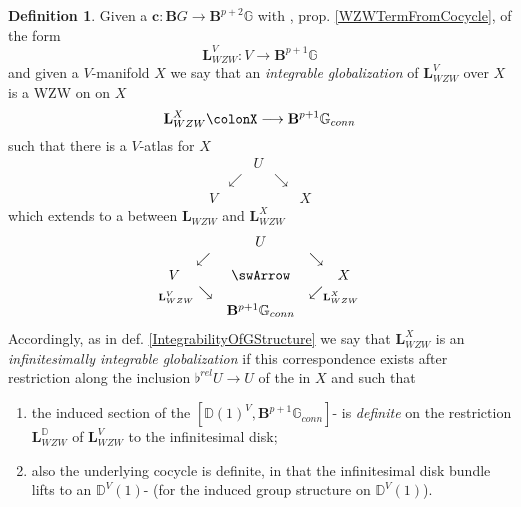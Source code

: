 \documentclass[12pt,titlepage]{article}
\def\mathllap{\mathpalette\mathllapinternal}
\def\mathrlap{\mathpalette\mathrlapinternal}
\def\mathllapinternal#1#2{\llap{$\mathsurround=0pt#1{#2}$}}
\def\mathrlapinternal#1#2{\rlap{$\mathsurround=0pt#1{#2}$}}
\newcommand{\itexarray}[1]{\begin{matrix}#1\end{matrix}}
\theoremstyle{plain}
\theoremstyle{definition}
\newtheorem{defn}{Definition}
\theoremstyle{remark}
\begin{document}
\begin{defn}
\label{DefiniteGlobalizationofWZWTerm}\hypertarget{DefiniteGlobalizationofWZWTerm}{}
Given a  $\mathbf{c} \colon \mathbf{B}G\to\mathbf{B}^{p+2}\mathbb{G}$ with , prop. \ref{WZWTermFromCocycle}, of the form
\begin{displaymath}
\mathbf{L}_{WZW}^V
\colon
V \longrightarrow \mathbf{B}^{p+1}\mathbb{G}
\end{displaymath}
and given a $V$-manifold $X$ we say that an \emph{integrable globalization} of $\mathbf{L}_{WZW}^V$ over $X$ is a WZW on on $X$
\begin{displaymath}
\mathbf{L}_{WZW}^X \colonX \longrightarrow \mathbf{B}^{p+1}\mathbb{G}_{conn}
\end{displaymath}
such that there is a $V$-atlas for $X$
\begin{displaymath}
\itexarray{
&& U
\\
& \swarrow && \searrow
\\
V && && X
}
\end{displaymath}
which extends to a  between $\mathbf{L}_{WZW}$ and $\mathbf{L}_{WZW}^X$
\begin{displaymath}
\itexarray{
&& U
\\
& \swarrow && \searrow
\\
V && \swArrow && X
\\
& {}_{\mathllap{\mathbf{L}_{WZW}^V}}\searrow && \swarrow_{\mathrlap{\mathbf{L}_{WZW}^X}}
\\
&& \mathbf{B}^{p+1}\mathbb{G}_{conn}
}
\end{displaymath}
Accordingly, as in def. \ref{IntegrabilityOfGStructure} we say that $\mathbf{L}_{WZW}^X$ is an \emph{infinitesimally integrable globalization} if this correspondence exists after restriction along the inclusion $\flat^{rel} U \to U$ of the  in $X$ and such that
\begin{enumerate}%
\item the induced section of the  $[\mathbb{D}(1)^V,\mathbf{B}^{p+1}\mathbb{G}_{conn}]$- is \emph{definite} on the restriction $\mathbf{L}_{WZW}^{\mathbb{D}}$ of $\mathbf{L}_{WZW}^V$ to the infinitesimal disk;
\item also the underlying cocycle is definite, in that the infinitesimal disk bundle lifts to an $\mathbb{D}^V(1)$- (for the induced group structure on $\mathbb{D}^V(1)$).
\end{enumerate}
\end{defn}
\end{document}
